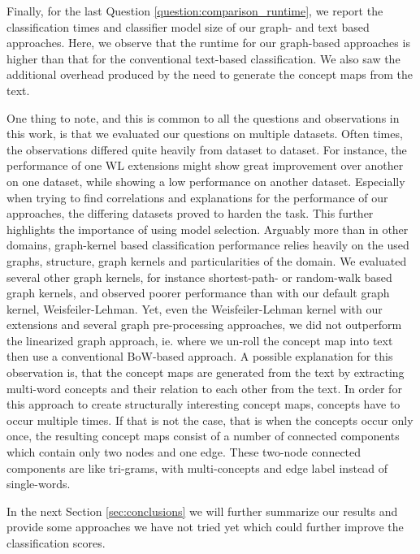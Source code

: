 Finally, for the last Question \ref{question:comparison_runtime}, we report the classification times and classifier model size of our graph- and text based approaches.
Here, we observe that the runtime for our graph-based approaches is higher than that for the conventional text-based classification.
We also saw the additional overhead produced by the need to generate the concept maps from the text.

One thing to note, and this is common to all the questions and observations in this work, is that we evaluated our questions on multiple datasets. Often times, the observations differed quite heavily from dataset to dataset.
For instance, the performance of one WL extensions might show great improvement over another on one dataset, while showing a low performance on another dataset. 
Especially when trying to find correlations and explanations for the performance of our approaches, the differing datasets proved to harden the task.
This further highlights the importance of using model selection.
Arguably more than in other domains,  graph-kernel based classification performance relies heavily on the used graphs, structure, graph kernels and particularities of the domain.
We evaluated several other graph kernels, for instance shortest-path- or random-walk based graph kernels, and observed poorer performance than with our default graph kernel, Weisfeiler-Lehman.
Yet, even the Weisfeiler-Lehman kernel with our extensions and several graph pre-processing approaches, we did not outperform the linearized graph approach, ie. where we un-roll the concept map into text then use a conventional BoW-based approach.
A possible explanation for this observation is, that the concept maps are generated from the text by extracting multi-word concepts and their relation to each other from the text.
In order for this approach to create structurally interesting concept maps, concepts have to occur multiple times.
If that is not the case, that is when the concepts occur only once, the resulting concept maps consist of a number of connected components which contain only two nodes and one edge.
These two-node connected components are like tri-grams, with multi-concepts and edge label instead of single-words.

In the next Section \ref{sec:conclusions} we will further summarize our results and provide some approaches we have not tried yet which could further improve the classification scores.


